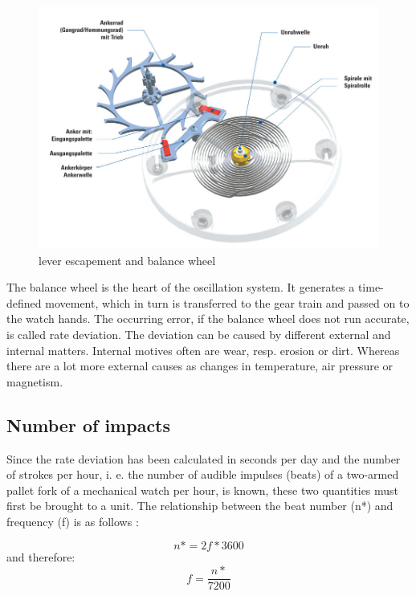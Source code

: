 \documentclass[12pt, a4paper]{report}
\begin{document}
    \noindent
    \begin{figure}[H]
    \centering
    \includegraphics[scale=0.4]{Images/Hemmung-Teil1.jpg}
    
    \caption{lever escapement and balance wheel \cite{Uhrwerk}}
    \end{figure}
\bigskip
The balance wheel is the heart of the oscillation system. It generates a time-defined movement, which in turn is transferred to the gear train and passed on to the watch hands. 
The occurring error, if the balance wheel does not run accurate, is called rate deviation. The deviation can be caused by different external and internal matters. Internal motives often are wear, resp. erosion or dirt. Whereas there are a lot more external causes as changes in temperature, air pressure or magnetism.
    
    \subsection{Number of impacts}
    Since the rate deviation has been calculated in seconds per day and the number of strokes per hour, i. e. the number of audible impulses (beats) of a two-armed pallet fork of a mechanical watch per hour, is known, these two quantities must first be brought to a unit. The relationship between the beat number (n*) and frequency (f) is as follows \cite{Krug1987}: 
    
    \begin{displaymath}
    n* = 2f*3600
     \end{displaymath}
     and therefore:
     \begin{displaymath}
      f = \frac{n*}{7200}
     \end{displaymath}
     
\end{document}
